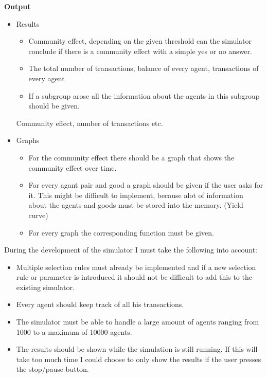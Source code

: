 \documentclass{article}
\begin{document}
\textbf{Output}

\begin{itemize}
  \item Results
	\begin{itemize}
 		 \item Community effect, depending on the given threshold can the simulator conclude if there is a community effect with a simple yes or no answer.
 		 \item The total number of transactions, balance of every agent, transactions of every agent
		 \item If a subgroup arose all the information about the agents in this subgroup should be given.
	\end{itemize} Community effect, number of transactions etc.
  \item Graphs
	\begin{itemize}
 		 \item For the community effect there should be a graph that shows the community effect over time.
 		 \item For every agant pair and good a graph should be given if the user asks for it. This might be difficult to implement, because alot of information about the agents and goods must be stored into the memory. (Yield curve)
		\item For every graph the corresponding function must be given.
	\end{itemize} 
\end{itemize}

During the development of the simulator I must take the following into account:
\begin{itemize}
  \item Multiple selection rules must already be implemented and if a new selection rule or parameter is introduced it should not be difficult to add this to the existing simulator.
 \item Every agent should keep track of all his transactions.
  \item The simulator must be able to handle a large amount of agents ranging from 1000 to a maximum of 10000 agents. 
  \item The results should be shown while the simulation is still running. If this will take too much time I could choose to only show the results if the user presses the stop/pause button.
\end{itemize}
\end{document}
